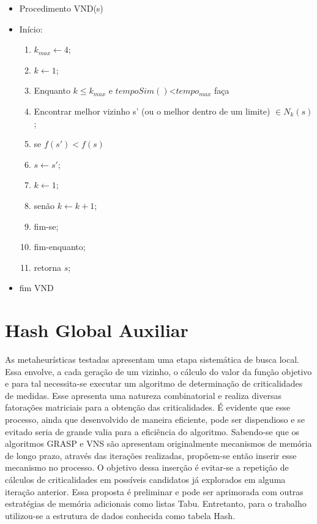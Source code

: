 \documentclass[12pt]{article}
\begin{document}
\begin{itemize}
	\item Procedimento VND(s) 
	\item Início:
	\begin{enumerate}
		\item $k_{max} \leftarrow 4$; 
		\item $k \leftarrow 1$;
		\item Enquanto $k \leq k_{max}$ e $tempoSim()$<$tempo_{max}$ faça
		\item \quad Encontrar melhor vizinho s' (ou o melhor dentro de um limite) $\in N_k(s)$; 
		\item \quad se $f(s') < f(s)$
		\item \qquad  $s \leftarrow s'$;
		\item \qquad  $k \leftarrow 1$;
		\item \quad senão $k \leftarrow k + 1$;
		\item \quad fim-se;
		\item fim-enquanto;
		\item retorna $s$;
	\end{enumerate}	
	\item fim VND
\end{itemize}



\section{Hash Global Auxiliar}
As metaheurísticas testadas apresentam uma etapa sistemática de busca local. Essa envolve, a cada geração de um vizinho, o cálculo do valor da função objetivo e para tal necessita-se executar um algoritmo de determinação de criticalidades de medidas. Esse apresenta uma natureza combinatorial e realiza diversas fatorações matriciais para a obtenção das criticalidades. É evidente que esse processo, ainda que desenvolvido de maneira eficiente, pode ser dispendioso e se evitado seria de grande valia para a eficiência do algoritmo. Sabendo-se que os algoritmos GRASP e VNS são apresentam originalmente mecanismos de memória de longo prazo, através das iterações realizadas, propõem-se então inserir esse mecanismo no processo. O objetivo dessa inserção é evitar-se a repetição de cálculos de criticalidades em possíveis candidatos já explorados em alguma iteração anterior. Essa proposta é preliminar e pode ser aprimorada com outras estratégias de memória adicionais como listas Tabu. Entretanto, para o trabalho utilizou-se a estrutura de dados conhecida como tabela Hash.
\end{document}
